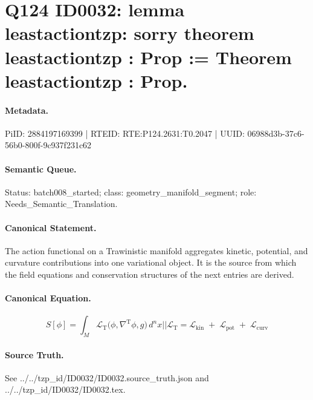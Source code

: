 \section*{Q124 ID0032: lemma leastactiontzp: sorry theorem leastactiontzp : Prop := Theorem leastactiontzp : Prop.}
\paragraph{Metadata.}
PiID: 2884197169399 | RTEID: RTE:P124.2631:T0.2047 | UUID: 06988d3b-37c6-56b0-800f-9c937f231c62

\paragraph{Semantic Queue.}
Status: batch008\_started; class: geometry\_manifold\_segment; role: Needs\_Semantic\_Translation.

\paragraph{Canonical Statement.}
The action functional on a Trawinistic manifold aggregates kinetic, potential, and curvature contributions into one variational object. It is the source from which the field equations and conservation structures of the next entries are derived.

\paragraph{Canonical Equation.}
\[
S[\phi] = \int_{M} \mathcal{L}_{\mathrm{T}} \bigl( \phi,\nabla^{\mathrm{T}}\phi,g \bigr)\, d^{n}x || \mathcal{L}_{\mathrm{T}} = \mathcal{L}_{\mathrm{kin}} \;+\; \mathcal{L}_{\mathrm{pot}} \;+\; \mathcal{L}_{\mathrm{curv}}
\]

\paragraph{Source Truth.}
See ../../tzp\_id/ID0032/ID0032.source\_truth.json and ../../tzp\_id/ID0032/ID0032.tex.
